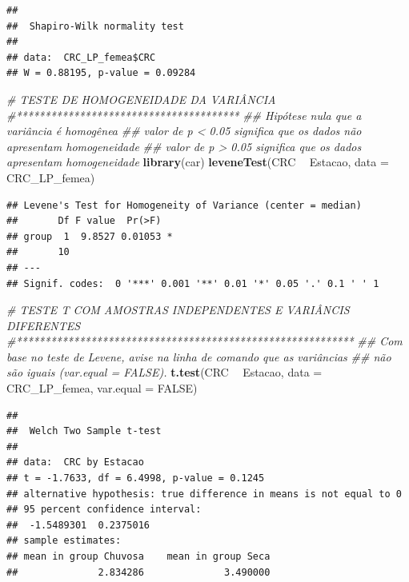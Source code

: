 \documentclass[
]{book}
\newenvironment{Shaded}{\begin{snugshade}}{\end{snugshade}}
\newcommand{\CommentTok}[1]{\textcolor[rgb]{0.56,0.35,0.01}{\textit{#1}}}
\newcommand{\DataTypeTok}[1]{\textcolor[rgb]{0.13,0.29,0.53}{#1}}
\newcommand{\KeywordTok}[1]{\textcolor[rgb]{0.13,0.29,0.53}{\textbf{#1}}}
\newcommand{\NormalTok}[1]{#1}
\newcommand{\OperatorTok}[1]{\textcolor[rgb]{0.81,0.36,0.00}{\textbf{#1}}}
\newcommand{\OtherTok}[1]{\textcolor[rgb]{0.56,0.35,0.01}{#1}}
\newcommand{\StringTok}[1]{\textcolor[rgb]{0.31,0.60,0.02}{#1}}
\begin{document}
\begin{verbatim}
## 
## 	Shapiro-Wilk normality test
## 
## data:  CRC_LP_femea$CRC
## W = 0.88195, p-value = 0.09284
\end{verbatim}

\begin{Shaded}
\begin{Highlighting}[]
\CommentTok{# TESTE DE HOMOGENEIDADE DA VARIÂNCIA}
\CommentTok{#***************************************}
\CommentTok{## Hipótese nula que a variância é homogênea}
\CommentTok{## valor de p < 0.05 significa que os dados não apresentam homogeneidade}
\CommentTok{## valor de p > 0.05 significa que os dados apresentam homogeneidade}
\KeywordTok{library}\NormalTok{(car)}
\KeywordTok{leveneTest}\NormalTok{(CRC }\OperatorTok{~}\StringTok{ }\NormalTok{Estacao, }\DataTypeTok{data =}\NormalTok{ CRC_LP_femea)}
\end{Highlighting}
\end{Shaded}

\begin{verbatim}
## Levene's Test for Homogeneity of Variance (center = median)
##       Df F value  Pr(>F)  
## group  1  9.8527 0.01053 *
##       10                  
## ---
## Signif. codes:  0 '***' 0.001 '**' 0.01 '*' 0.05 '.' 0.1 ' ' 1
\end{verbatim}

\begin{Shaded}
\begin{Highlighting}[]
\CommentTok{# TESTE T COM AMOSTRAS INDEPENDENTES E VARIÂNCIS DIFERENTES}
\CommentTok{#***********************************************************}
\CommentTok{## Com base no teste de Levene, avise na linha de comando que as variâncias }
\CommentTok{## não são iguais (var.equal = FALSE).}
\KeywordTok{t.test}\NormalTok{(CRC }\OperatorTok{~}\StringTok{ }\NormalTok{Estacao, }\DataTypeTok{data =}\NormalTok{ CRC_LP_femea, }\DataTypeTok{var.equal =} \OtherTok{FALSE}\NormalTok{)}
\end{Highlighting}
\end{Shaded}

\begin{verbatim}
## 
## 	Welch Two Sample t-test
## 
## data:  CRC by Estacao
## t = -1.7633, df = 6.4998, p-value = 0.1245
## alternative hypothesis: true difference in means is not equal to 0
## 95 percent confidence interval:
##  -1.5489301  0.2375016
## sample estimates:
## mean in group Chuvosa    mean in group Seca 
##              2.834286              3.490000
\end{verbatim}
\end{document}
